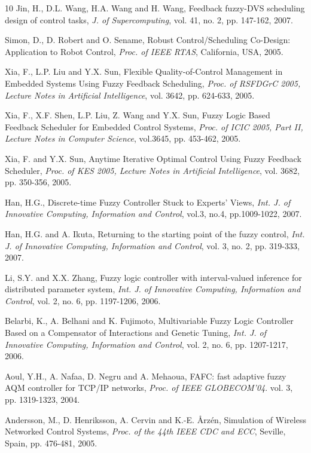 \documentclass[12pt,a4paper]{ijicic}
\begin{document}
\begin {thebibliography}{10}
Jin, H., D.L. Wang, H.A. Wang and H. Wang, Feedback fuzzy-DVS
scheduling design of control tasks, \emph{J. of Supercomputing},
vol. 41, no. 2, pp. 147-162, 2007.

Simon, D., D. Robert and O. Sename, Robust Control/Scheduling
Co-Design: Application to Robot Control, \emph{Proc. of IEEE RTAS},
California, USA, 2005.

Xia, F., L.P. Liu and Y.X. Sun, Flexible Quality-of-Control
Management in Embedded Systems Using Fuzzy Feedback Scheduling,
\emph{Proc. of RSFDGrC 2005, Lecture Notes in Artificial
Intelligence}, vol. 3642, pp.  624-633, 2005.

Xia, F., X.F. Shen, L.P. Liu, Z. Wang and Y.X. Sun, Fuzzy Logic
Based Feedback Scheduler for Embedded Control Systems, \emph{Proc.
of ICIC 2005, Part II, Lecture Notes in Computer Science},
vol.3645, pp. 453-462, 2005.

Xia, F. and Y.X. Sun, Anytime Iterative Optimal Control Using Fuzzy
Feedback Scheduler, \emph{Proc. of KES 2005, Lecture Notes in
Artificial Intelligence}, vol. 3682, pp. 350-356, 2005.

Han, H.G., Discrete-time Fuzzy Controller Stuck to Experts' Views,
\emph{Int. J. of Innovative Computing, Information and Control},
vol.3, no.4, pp.1009-1022, 2007.

Han, H.G. and A. Ikuta, Returning to the starting point of the fuzzy
control, \emph{Int. J. of Innovative Computing, Information and
Control}, vol. 3, no. 2, pp. 319-333, 2007.

Li, S.Y. and X.X. Zhang, Fuzzy logic controller with interval-valued
inference for distributed parameter system, \emph{Int. J. of
Innovative Computing, Information and Control}, vol. 2, no. 6, pp.
1197-1206, 2006.

Belarbi, K., A. Belhani and K. Fujimoto, Multivariable Fuzzy Logic
Controller Based on a Compensator of Interactions and Genetic
Tuning, \emph{Int. J. of Innovative Computing, Information and
Control}, vol. 2, no. 6, pp. 1207-1217, 2006.

Aoul, Y.H., A. Nafaa, D. Negru and A. Mehaoua, FAFC: fast adaptive
fuzzy AQM controller for TCP/IP networks, \emph{Proc. of IEEE
GLOBECOM'04}. vol. 3, pp. 1319-1323, 2004.

Andersson, M., D. Henriksson, A. Cervin and K.-E. {\AA}rz\'{e}n,
Simulation of Wireless Networked Control Systems, \emph{Proc. of the
44th IEEE CDC and ECC}, Seville, Spain, pp. 476-481, 2005.
\end{thebibliography}
\end{document}
